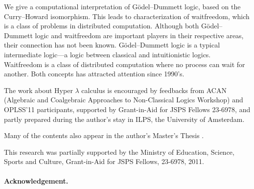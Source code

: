 \documentclass[doctor,interim]{iscs-thesis}
\date{July 4, 2012}
\begin{document}
\begin{eabstract}
 We give a computational interpretation of G\"odel--Dummett logic, based
 on the Curry--Howard isomorphism.  This leads to characterization
 of waitfreedom, which is a class of problems in distributed
 computation.  Although both G\"odel--Dummett logic and waitfreedom are
 important players in their respective areas, their connection has not
 been known.  G\"odel--Dummett logic is a typical intermediate logic---a
 logic between classical and intuitionistic logics.
 Waitfreedom is a class of distributed computation where no process can
 wait for another.  Both concepts has attracted attention since 1990's.
\end{eabstract}

\begin{jabstract}
 $B%
 $B$k!#$9$k$H!"J,;67W;;$NLdBj%
 $B%
 $B$3$l$i$N4XO"$O!"$3$l$^$GCN$i$l$F$$$J$+$C$?!#(B
\end{jabstract}

\maketitle

\begin{acknowledge}
The work about Hyper $\lambda$ calculus is encouraged by feedbacks from
ACAN (Algebraic and
Coalgebraic
Approaches to
Non-Classical Logics Workshop) and OPLSS'11 participants,
supported by Grant-in-Aid for JSPS Fellows 23-6978,
and partly prepared during the author's stay in
ILPS, the University of Amsterdam.


Many of the contents also appear in the author's Master's Thesis .
\end{acknowledge}

\frontmatter
\tableofcontents

\listoffigures
\listoftables

\mainmatter








This research was partially supported by the Ministry of Education,
Science, Sports and Culture, Grant-in-Aid for JSPS Fellows, 23-6978, 2011.






\paragraph{Acknowledgement.}

\appendix



\end{document}
